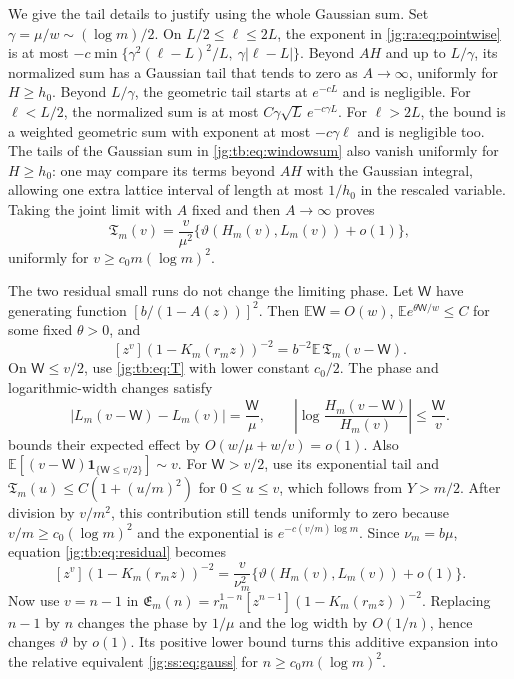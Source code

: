 \documentclass[11pt,a4paper]{article}
\theoremstyle{definition}\newaliascnt{definition}{theorem}
\theoremstyle{remark}\newaliascnt{remark}{theorem}
\newcommand{\one}{\mathbf 1}
\newcommand{\ljE}{\mathbb E}
\begin{document}
We give the tail details to justify using the whole Gaussian sum. Set
$\gamma=\mu/w\sim(\log m)/2$. On $L/2\le\ell\le2L$, the exponent in
\eqref{jg:ra:eq:pointwise} is at most
$-c\min\{\gamma^2(\ell-L)^2/L,\ \gamma|\ell-L|\}$. Beyond $AH$ and up to
$L/\gamma$, its normalized sum has a Gaussian tail that tends to zero as
$A\to\infty$, uniformly for $H\ge h_0$. Beyond $L/\gamma$, the geometric tail
starts at $e^{-cL}$ and is negligible. For $\ell<L/2$, the normalized sum is at
most $C\gamma\sqrt L\,e^{-c\gamma L}$. For $\ell>2L$, the bound is a weighted
geometric sum with exponent at most $-c\gamma\ell$ and is negligible too. The
tails of the Gaussian sum in \eqref{jg:tb:eq:windowsum} also vanish uniformly for
$H\ge h_0$: one may compare its terms beyond $AH$ with the Gaussian integral,
allowing one extra lattice interval of length at most $1/h_0$ in the rescaled
variable. Taking the joint limit with $A$ fixed and then $A\to\infty$ proves
\begin{equation}\label{jg:tb:eq:T}
 \mathfrak T_m(v)=\frac v{\mu^2}
        \{\vartheta(H_m(v),L_m(v))+o(1)\},
\end{equation}
uniformly for $v\ge c_0m(\log m)^2$.

The two residual small runs do not change the limiting phase. Let $\mathsf W$
have generating function $[b/(1-A(z))]^2$. Then $\ljE\mathsf W=O(w)$,
$\ljE e^{\theta\mathsf W/w}\le C$ for some fixed $\theta>0$, and
\begin{equation}\label{jg:tb:eq:residual}
 [z^v](1-K_m(r_mz))^{-2}=b^{-2}\ljE\,\mathfrak T_m(v-\mathsf W).
\end{equation}
On $\mathsf W\le v/2$, use \eqref{jg:tb:eq:T} with lower constant $c_0/2$. The
phase and logarithmic-width changes satisfy
\[
 |L_m(v-\mathsf W)-L_m(v)|=\frac{\mathsf W}{\mu},\qquad
 \left|\log\frac{H_m(v-\mathsf W)}{H_m(v)}\right|
       \le\frac{\mathsf W}v.
\]
 bounds their expected effect by $O(w/\mu+w/v)=o(1)$.
Also $\ljE[(v-\mathsf W)\one_{\{\mathsf W\le v/2\}}]\sim v$. For
$\mathsf W>v/2$, use its exponential tail and $\mathfrak T_m(u)\le
C(1+(u/m)^2)$ for $0\le u\le v$, which follows from $Y>m/2$. After division by
$v/m^2$, this contribution still tends uniformly to zero because
$v/m\ge c_0(\log m)^2$ and the exponential is $e^{-c(v/m)\log m}$. Since
$\nu_m=b\mu$, equation \eqref{jg:tb:eq:residual} becomes
\begin{equation}\label{jg:tb:eq:squared}
 [z^v](1-K_m(r_mz))^{-2}
 =\frac v{\nu_m^2}
       \{\vartheta(H_m(v),L_m(v))+o(1)\}.
\end{equation}
Now use $v=n-1$ in $\mathfrak E_m(n)=r_m^{1-n}[z^{n-1}](1-K_m(r_mz))^{-2}$.
Replacing $n-1$ by $n$ changes the phase by $1/\mu$ and the log width by
$O(1/n)$, hence changes $\vartheta$ by $o(1)$. Its positive lower bound turns
this additive expansion into the relative equivalent \eqref{jg:ss:eq:gauss}
for $n\ge c_0m(\log m)^2$.
\end{document}
